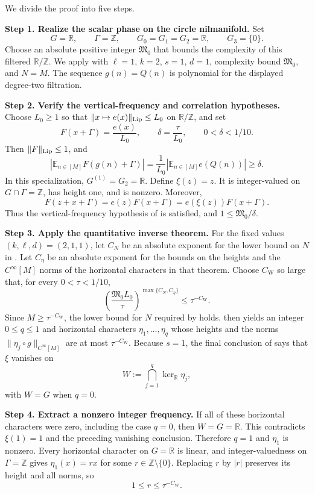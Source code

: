 \documentclass[twoside]{aomart}
\makeatletter
\theoremstyle{paperplain}
\theoremstyle{paperdefinition}
\renewenvironment{proof}[1][\proofname]{\par\pushQED{\qed}%
  \normalfont\topsep6\p@\@plus3\p@\relax\trivlist
  \item[\hskip\labelsep\itshape #1\@addpunct{.}]\ignorespaces
}{\popQED\endtrivlist\@endpefalse}
\newcommand{\Z}{\mathbb Z}
\newcommand{\R}{\mathbb R}
\numberwithin{equation}{section}
\makeatother
\begin{document}
\begin{proof}
We divide the proof into five steps.

\medskip
\noindent\textbf{Step 1. Realize the scalar phase on the circle nilmanifold.}
Set
\[
 G=\mathbb R,\qquad \Gamma=\mathbb Z,\qquad
 G_0=G_1=G_2=\mathbb R,\qquad G_3=\{0\}.
\]
Choose an absolute positive integer $\mathfrak M_0$ that bounds the
complexity of this filtered $\R/\Z$. We apply  with
$\ell=1$, $k=2$, $s=1$, $d=1$, complexity bound $\mathfrak M_0$,
and $N=M$. The sequence $g(n)=Q(n)$ is polynomial for the displayed
degree-two filtration.

\medskip
\noindent\textbf{Step 2. Verify the vertical-frequency and correlation hypotheses.}
Choose $L_0\ge1$ so that
$\|x\mapsto e(x)\|_{\rm Lip}\le L_0$ on $\mathbb R/\mathbb Z$, and set
\[
 F(x+\Gamma)=\frac{e(x)}{L_0},\qquad
 \delta=\frac{\tau}{L_0},\qquad 0<\delta<1/10.
\]
Then $\|F\|_{\rm Lip}\le1$, and
\[
 \left|\mathbb E_{n\in[M]}F(g(n)+\Gamma)\right|
 =\frac1{L_0}\left|\mathbb E_{n\in[M]}e(Q(n))\right|
 \ge\delta.
\]
In this specialization, $G^{(1)}=G_2=\mathbb R$. Define
$\xi(z)=z$. It is integer-valued on $G\cap\Gamma=\mathbb Z$, has height
one, and is nonzero. Moreover,
\[
 F(z+x+\Gamma)=e(z)F(x+\Gamma)=e(\xi(z))F(x+\Gamma).
\]
Thus the vertical-frequency hypothesis of  is satisfied,
and $1\le\mathfrak M_0/\delta$.

\medskip
\noindent\textbf{Step 3. Apply the quantitative inverse theorem.}
For the fixed values $(k,\ell,d)=(2,1,1)$, let $C_N$ be an absolute
exponent for the lower bound on $N$ in . Let
$C_\eta$ be an absolute exponent for the bounds on the heights and the
$C^\infty[M]$ norms of the horizontal characters in that theorem.
Choose $C_{\mathrm W}$ so large that, for every $0<\tau<1/10$,
\[
 \left(\frac{\mathfrak M_0L_0}{\tau}\right)^{\max\{C_N,C_\eta\}}
 \le \tau^{-C_{\mathrm W}}.
\]
Since $M\ge\tau^{-C_{\mathrm W}}$, the lower bound for $N$ required by
 holds.  then yields an integer $0\le q\le1$
and horizontal characters $\eta_1,\ldots,\eta_q$ whose heights and
the norms $\|\eta_j\circ g\|_{C^\infty[M]}$ are at most
$\tau^{-C_{\mathrm W}}$.
Because $s=1$, the final conclusion of  says that $\xi$
vanishes on
\[
 W:=\bigcap_{j=1}^q\ker_{\mathbb R}\eta_j,
\]
with $W=G$ when $q=0$.

\medskip
\noindent\textbf{Step 4. Extract a nonzero integer frequency.}
If all of these horizontal characters were zero, including the case $q=0$,
then $W=G=\mathbb R$. This contradicts $\xi(1)=1$ and the preceding
vanishing conclusion. Therefore $q=1$ and $\eta_1$ is nonzero. Every
horizontal character on $G=\mathbb R$ is linear, and integer-valuedness on
$\Gamma=\mathbb Z$ gives $\eta_1(x)=rx$ for some
$r\in\mathbb Z\setminus\{0\}$. Replacing $r$ by $|r|$ preserves its
height and all norms, so
\[
 1\le r\le\tau^{-C_{\mathrm W}}.
\]


\end{proof}
\end{document}
